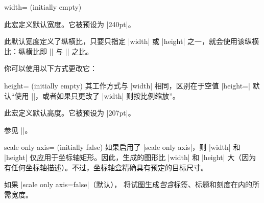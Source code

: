 \begin{pgfplotskey}{width= (initially empty)}
    \begin{command}{\axisdefaultwidth}
        此宏定义默认宽度。它被预设为 |240pt|。

        此默认宽度定义了纵横比，只要只指定 |width| 或 |height| 之一，就会使用该纵横比：纵横比即 |\axisdefaultwidth| 与 |\axisdefaultheight| 之比。

        你可以使用以下方式更改它：
\begin{codeexample}
\def\axisdefaultwidth{10cm}
\end{codeexample}
    \end{command}
\end{pgfplotskey}

\begin{pgfplotskey}{height= (initially empty)}
    其工作方式与 |width| 相同，区别在于空值 |height={}| 默认“使用 |\axisdefaultheight|，或者如果只更改了 |width| 则按比例缩放”。

    \begin{command}{\axisdefaultheight}
        此宏定义默认高度。它被预设为 |207pt|。

        参见 |\axisdefaultwidth|。
    \end{command}
\end{pgfplotskey}

\begin{pgfplotskey}{scale only axis= (initially false)}
    如果启用了 |scale only axis|，则 |width| 和 |height| 仅应用于坐标轴矩形。因此，生成的图形比 |width| 和 |height| 大（因为有任何坐标轴描述）。不过，坐标轴盒精确具有预定的目标尺寸。

    如果 |scale only axis=false|（默认），\PGFPlots{} 将试图生成\emph{包含}标签、标题和刻度在内的所需宽度。
\end{pgfplotskey}

